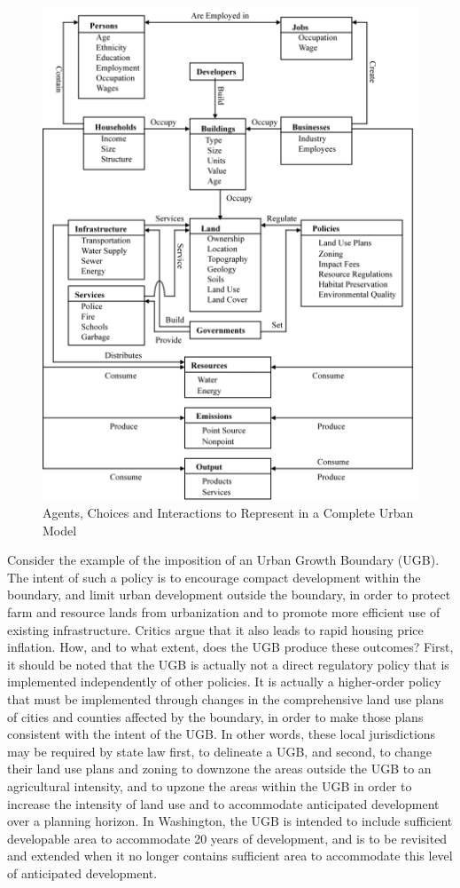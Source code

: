 \begin{figure}[htp]
\begin{center}
\includegraphics[scale=0.8]{graphics/data-model.png}
\end{center}
\caption{\label{fig:data-model}{Agents, Choices and Interactions to Represent in a Complete Urban Model}}
\end{figure}


Consider the example of the imposition of an Urban Growth Boundary (UGB).  The intent of such a policy is to encourage compact development within the boundary, and limit urban development outside the boundary, in order to protect farm and resource lands from urbanization and to promote more efficient use of existing infrastructure.  Critics argue that it also leads to rapid housing price inflation.  How, and to what extent, does the UGB produce these outcomes?   First, it should be noted that the UGB is actually not a direct regulatory policy that is implemented independently of other policies.  It is actually a higher-order policy that must be implemented through changes in the comprehensive land use plans of cities and counties affected by the boundary, in order to make those plans consistent with the intent of the UGB.  In other words, these local jurisdictions may be required by state law first, to delineate a UGB, and second, to change their land use plans and zoning to downzone the areas outside the UGB to an agricultural intensity, and to upzone the areas within the UGB in order to increase the intensity of land use and to accommodate anticipated development over a planning horizon.  In Washington, the UGB is intended to include sufficient developable area to accommodate 20 years of development, and is to be revisited and extended when it no longer contains sufficient area to accommodate this level of anticipated development.

